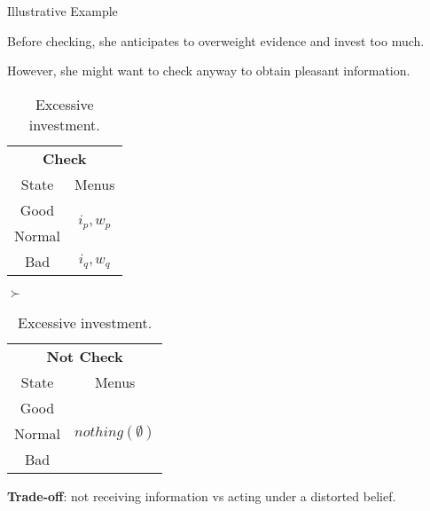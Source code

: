 \documentclass[usenames,dvipsnames,aspectratio=169,11pt, envcountsect, handout]{beamer}
\begin{document}
\begin{frame}[noframenumbering]{Illustrative Example}

	Before checking, she anticipates to overweight evidence and invest too much.

	\vfill

	However, she might want to check anyway to obtain pleasant information. \pause

	\vfill

	\begin{table}[H]
		\centering
		\begin{minipage}{0.29\textwidth}

		\end{minipage}\hspace{0.3cm} %
		\begin{minipage}{0.29\textwidth}
			\centering
			\begin{tabular}{c | c}
				\multicolumn{2}{c}{\textbf{Check}}                                     \\
				State                & Menus                                           \\
				\hline
				{\color{blue}Good}   & \multirow{2}{*}{{\color{blue}\( i_{p}, w_p \)}} \\
				{\color{blue}Normal} &                                                 \\
				\hline
				Bad                  & \(  i_{q}, w_q \)                               \\
			\end{tabular}
			\vspace{0.5cm} %
		\end{minipage}\hspace{0.5cm} %
		\( \succ \)
		\begin{minipage}{0.29\textwidth}
			\centering
			\begin{tabular}{c | c}
				\multicolumn{2}{c}{\textbf{Not Check}}                            \\
				State  & Menus                                                    \\
				\hline
				Good   & \multirow{3}{*}{ \( nothing \left( \emptyset \right) \)} \\
				Normal &                                                          \\
				Bad    &                                                          \\
			\end{tabular}
			\vspace{0.5cm} %
		\end{minipage}
		\caption{Excessive investment.} %
		\label{tab:excess}
	\end{table} \pause

	\vfill

	\textbf{Trade-off}: not receiving information vs acting under a distorted belief.

\end{frame}
\end{document}
